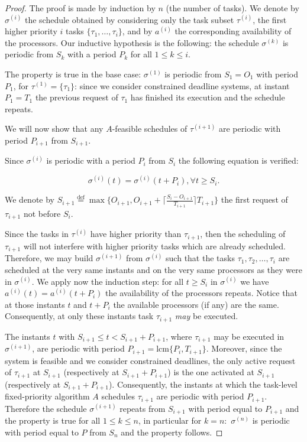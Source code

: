 \documentclass[a4paper,11pt]{article}
\newcommand{\equals}{\stackrel{\mathrm{def}}{=}}
\newcommand{\lcm}{\mathrm{lcm}}
\begin{document}
\begin{proof}
  The proof is made by induction by $n$ (the number of tasks). We
  denote by $\sigma^{(i)}$ the schedule obtained by considering only
  the task subset $\tau^{(i)}$, the first higher priority $i$ tasks
  $\{\tau_1, \ldots, \tau_i \}$, and by $a^{(i)}$ the corresponding
  availability of the processors. Our inductive hypothesis is the
  following: the schedule $\sigma^{(k)}$ is periodic from $S_k$ with a
  period $P_k$ for all $1 \leq k \leq i$.

  The property is true in the base case: $\sigma^{(1)}$ is periodic
  from $S_1=O_1$ with period $P_1$, for $\tau^{(1)}= \{\tau_1 \}$:
  since we consider constrained deadline systems, at instant $P_1=T_1$ the
  previous request of $\tau_1$ has finished its execution and the
  schedule repeats.

  We will now show that any $A$-feasible schedules of $\tau^{(i+1)}$ are
  periodic with period $P_{i+1}$ from $S_{i+1}$.

  Since $\sigma^{(i)}$ is periodic with a period $P_{i}$ from $S_{i}$ the
  following equation is verified:

\begin{equation}
  \label{stateInter}
\sigma^{(i)}(t)=\sigma^{(i)}(t+P_i), \forall t \geq S_{i}.
\end{equation}

We denote by $S_{i+1} \equals \max \{ O_{i+1}, O_{i+1}+ \lceil
\frac{S_{i}-O_{i+1}}{T_{i+1}} \rceil T_{i+1} \}$ the first request of
$\tau_{i+1}$ not before $S_i$.

Since the tasks in $\tau^{(i)}$ have higher priority than
$\tau_{i+1}$, then the scheduling of $\tau_{i+1}$ will not interfere with
higher priority tasks which are already scheduled. Therefore, we may
build $\sigma^{(i+1)}$ from $\sigma^{(i)}$ such that the tasks
$\tau_1, \tau_2, \ldots, \tau_i$ are scheduled at the very same
instants and on the very same processors as they were in
$\sigma^{(i)}$. We apply now the induction step: for all $t \geq
S_{i}$ in $\sigma^{(i)}$ we have $a^{(i)}(t) = a^{(i)}(t +P_i)$ the
availability of the processors repeats. Notice that at those instants $t$
and $t+P_i$ the available processors (if any) are the same. Consequently, at
only these instants task $\tau_{i+1}$ {\em may} be executed.

The instants $t$ with $S_{i+1} \leq t < S_{i+1}+P_{i+1}$, where
$\tau_{i+1}$ may be executed in $\sigma^{(i+1)}$, are periodic with
period $P_{i+1} = \lcm\{P_{i},T_{i+1}\}$. Moreover, since the system is feasible and we consider constrained deadlines, the only active request of $\tau_{i+1}$ at $S_{i+1}$ (respectively at $S_{i+1}+P_{i+1}$) is the one activated at $S_{i+1}$ (respectively at $S_{i+1}+P_{i+1}$). Consequently, the instants at which the task-level fixed-priority algorithm $A$ schedules $\tau_{i+1}$ are periodic with period $P_{i+1}$. Therefore the schedule $\sigma^{(i+1)}$ repeats from $S_{i+1}$ with period equal to $P_{i+1}$ and the property is true for all $1 \leq k \leq n$, in particular for $k=n:$ $\sigma^{(n)}$ is periodic with period equal to $P$ from $S_n$ and the property follows.
\end{proof}
\end{document}
